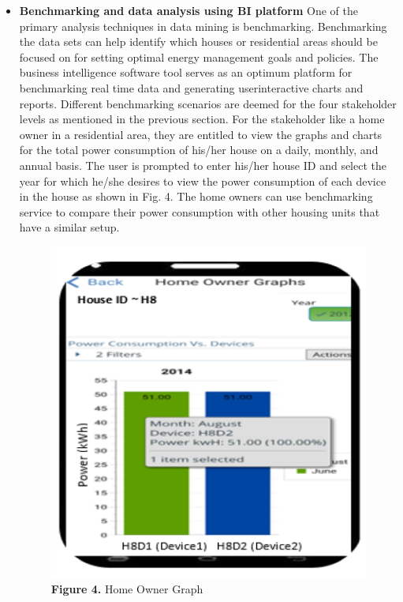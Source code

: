 \documentclass[a4paper,12pt,oneside]{article}
\let\counterwithin\relax
\begin{document}
\begin{itemize}
    \item \textbf{Benchmarking and data analysis using BI platform}
    \newline
    One of the primary analysis techniques in data mining is
    benchmarking. Benchmarking the data sets can help identify which houses or residential areas should be focused on for
    setting optimal energy management goals and policies. The
    business intelligence software tool serves as an optimum
    platform for benchmarking real time data and generating userinteractive
    charts and reports. Different benchmarking
    scenarios are deemed for the four stakeholder levels as
    mentioned in the previous section. 
    \newpage For the stakeholder
    like a home owner in a residential area, they are entitled to view the
    graphs and charts for the total power consumption of his/her
    house on a daily, monthly, and annual basis. The user is
    prompted to enter his/her house ID and select the year for
    which he/she desires to view the power consumption of each
    device in the house as shown in Fig. 4. The home owners can
    use benchmarking service to compare their power
    consumption with other housing units that have a similar
    setup.
    \newline
    \begin{figure}[H]
    \includegraphics{Figure4.png}
    \centering
    \caption{\textbf{Figure 4.} Home Owner Graph}

\end{figure}
\end{itemize}
\end{document}
